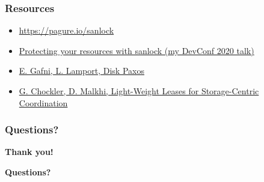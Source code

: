 \documentclass[10pt,utf8]{beamer}
\begin{document}
% 

\begin{frame}
    \frametitle{Resources}
    \begin{itemize}
    \item \small \color{blue}\url{https://pagure.io/sanlock}\color{black}
    \item \color{blue}\href{https://www.youtube.com/watch?v=we0zW7ekfAI}{Protecting your resources with sanlock (my DevConf 2020 talk)}\color{black}
     \item \color{blue}\href{http://lamport.azurewebsites.net/pubs/disk-paxos-disc.pdf}{E. Gafni, L. Lamport, Disk Paxos}\color{black}
     \item \color{blue}\href{https://groups.csail.mit.edu/tds/papers/Chockler/TR934.ps}{G. Chockler, D. Malkhi, Light-Weight Leases for Storage-Centric Coordination}\color{black}
    \end{itemize}
\end{frame}

\begin{frame}
    \frametitle{Questions?}
    \centering
     \textbf{\Huge{Thank you!}}
    
    \vspace{1.5cm}
    
    \textbf{\Huge{Questions?}}
\end{frame}
\end{document}
